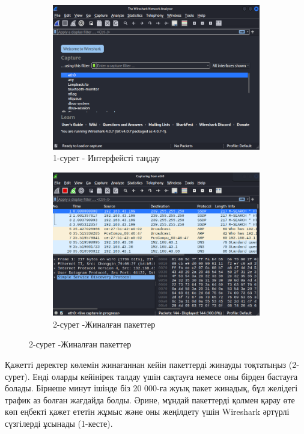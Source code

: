 \begin{figure}[H]
    \centering
    \begin{subfigure}[b]{0.45\textwidth}
        \centering
        \includegraphics[width=\linewidth]{assets/26}
        \caption*{1-сурет - Интерфейсті таңдау}
    \end{subfigure}\hfill
    \begin{subfigure}[b]{0.45\textwidth}
        \centering
        \includegraphics[width=\linewidth]{assets/27}
        \caption*{2-сурет -Жиналған пакеттер}
    \end{subfigure}
\end{figure}

\begin{multicols}{2}
Қажетті деректер көлемін жинағаннан кейін пакеттерді жинауды тоқтатыңыз
(2-сурет). Енді оларды кейінірек талдау үшін сақтауға немесе оны бірден
бастауға болады. Бірнеше минут ішінде біз 20 000-ға жуық пакет жинадық,
бұл желідегі трафик аз болған жағдайда болды. Әрине, мұндай пакеттерді
қолмен қарау өте көп еңбекті қажет ететін жұмыс және оны жеңілдету үшін
Wireshark әртүрлі сүзгілерді ұсынады (1-кесте).
\end{multicols}

